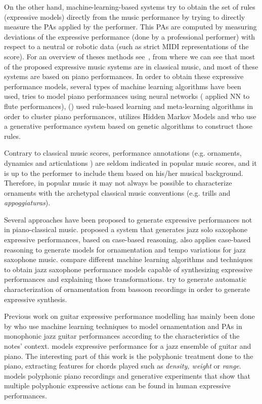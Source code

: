 On the other hand, machine-learning-based systems try to obtain the set of rules (expressive models) directly from the music performance by trying to directly measure the PAs applied by the performer. This PAs are computed by measuring deviations of the expressive performance (done by a professional performer) with respect to a neutral or robotic data (such as strict MIDI representations of the score). For an overview of theses methods see~\cite{Goebl2005}, from where we can see that most of the proposed expressive music systems are in classical music, and most of these systems are based on piano performances. In order to obtain these expressive performance models, several types of machine learning algorithms have been used, \cite{Bresin1998} tries to model piano performances using neural networks (\cite{Camurri2000} applied NN to flute performances), \cite{Widmer2003a} (\cite{Widmer2003}) used rule-based learning and meta-learning algorithms in order to cluster piano performances, \cite{Grindlay2006} utilizes Hidden Markov Models and \cite{Miranda2010} who use a generative performance system based on genetic algorithms to construct those rules. 

Contrary to classical music scores, performance annotations (e.g. ornaments, dynamics and articulations ) are seldom indicated in popular music scores, and it is up to the performer to include them based on his/her musical background. Therefore, in popular music it may not always be possible to characterize ornaments with the archetypal classical music conventions (e.g. trills and \textit{appoggiaturas}). 

Several approaches have been proposed to generate expressive performances not in piano-classical music. \cite{Arcos1998} proposed a system that generates jazz solo saxophone expressive performances, based on case-based reasoning. \cite{Grachten2006} also applies case-based reasoning to generate models for ornamentation and tempo variations for jazz saxophone music. \cite{Ramirez2006} compare different machine learning algorithms and techniques to obtain jazz saxophone performance models capable of synthesizing expressive performances and explaining those transformations. \cite{Puiggros2006} try to generate automatic characterization of ornamentation from bassoon recordings in order to generate expressive synthesis.

Previous work on guitar expressive performance modelling has mainly been done by \cite{Giraldo2016} who use machine learning techniques to model ornamentation and PAs in monophonic jazz guitar performances according to the characteristics of the notes' context.
\cite{bantula2016} models expressive performance for a jazz ensemble of guitar and piano. The interesting part of this work is the polyphonic treatment done to the piano, extracting features for chords played such as \textit{density, weight} or \textit{range}. \cite{KirkeAlexisMiranda2013} models polyphonic piano recordings and generative experiments that show that multiple polyphonic expressive actions can be found in human expressive performances. 
